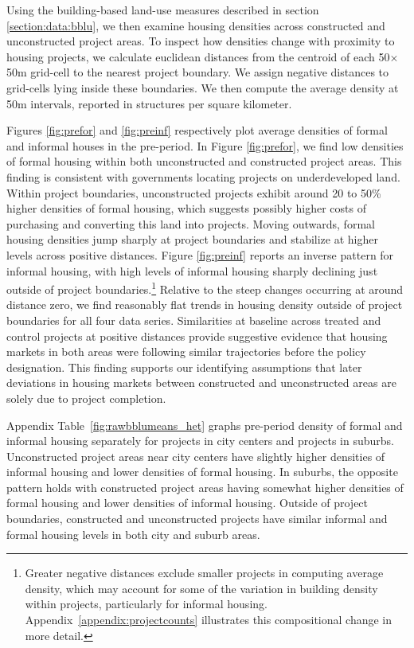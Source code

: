 \documentclass[12pt]{article}
\begin{document}
Using the building-based land-use measures described in section \ref{section:data:bblu}, we then examine housing densities across constructed and unconstructed project areas.  To inspect how densities change with proximity to housing projects, we calculate euclidean distances from the centroid of each 50$\times$50m grid-cell to the nearest project boundary. We assign negative distances to grid-cells lying inside these boundaries.  We then compute the average density at 50m intervals, reported in structures per square kilometer.  


Figures \ref{fig:prefor} and \ref{fig:preinf} respectively plot average densities of formal and informal houses in the pre-period. In Figure \ref{fig:prefor}, we find low densities of formal housing within both unconstructed and constructed project areas. This finding is consistent with governments locating projects on underdeveloped land.  Within project boundaries, unconstructed projects exhibit around 20 to 50\% higher densities of formal housing, which suggests possibly higher costs of purchasing and converting this land into projects.  Moving outwards, formal housing densities jump sharply at project boundaries and stabilize at higher levels across positive distances.  Figure \ref{fig:preinf} reports an inverse pattern for informal housing, with high levels of informal housing sharply declining just outside of project boundaries.\footnote{Greater negative distances exclude smaller projects in computing average density, which may account for some of the variation in building density within projects, particularly for informal housing.  Appendix~\ref{appendix:projectcounts} illustrates this compositional change in more detail.} Relative to the steep changes occurring at around distance zero,  we find reasonably flat trends in housing density outside of project boundaries for all four data series. Similarities at baseline across treated and control projects at positive distances provide suggestive evidence that housing markets in both areas were following similar trajectories before the policy designation.  This finding supports our identifying assumptions that later deviations in housing markets between constructed and unconstructed areas are solely due to project completion.

Appendix Table~\ref{fig:rawbblumeans_het} graphs pre-period density of formal and informal housing separately for projects in city centers and projects in suburbs.  Unconstructed project areas near city centers have slightly higher densities of informal housing and lower densities of formal housing.  In suburbs, the opposite pattern holds with constructed project areas having somewhat higher densities of formal housing and lower densities of informal housing.  Outside of project boundaries, constructed and unconstructed projects have similar informal and formal housing levels in both city and suburb areas.
\end{document}
